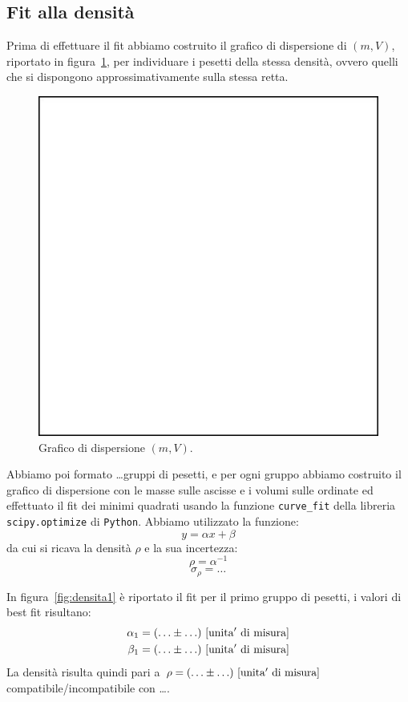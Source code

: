 \documentclass[a4paper]{article}
\begin{document}
\subsection{Fit alla densit\`a}

Prima di effettuare il fit abbiamo costruito il grafico di dispersione di $(m,V)$, riportato in figura~\ref{fig:dispersione},
per individuare i pesetti della stessa densit\`a, ovvero quelli che si dispongono approssimativamente sulla stessa retta.

\begin{figure}
    \centering
     \includegraphics[width=0.5\linewidth]{blankfig.pdf}
    \caption{Grafico di dispersione $(m,V)$.}
    \label{fig:dispersione}
\end{figure}

Abbiamo poi formato \ldots gruppi di pesetti, e per ogni gruppo abbiamo costruito il grafico di
dispersione con le masse sulle ascisse e i volumi sulle ordinate ed effettuato il fit dei minimi
quadrati usando la funzione \verb|curve_fit| della libreria \verb|scipy.optimize| di 
\verb|Python|. Abbiamo utilizzato la funzione:
\begin{equation}
    y = \alpha x + \beta
\end{equation}
da cui si ricava la densit\`a $\rho$ e la sua incertezza:
\begin{equation}
    \rho = \alpha^{-1}
\end{equation}
\begin{equation}
    \sigma_{\rho} = \ldots
\end{equation}

In figura~\ref{fig:densita1} \`e riportato il  fit per il primo gruppo di pesetti, i valori di best fit risultano:
\begin{eqnarray}
    \alpha_1 = (\ldots \pm \ldots)\ \rm [unita'\ di\ misura] \\
    \beta_1 = (\ldots \pm \ldots)\ \rm [unita'\ di\ misura]
\end{eqnarray}
La densit\`a risulta quindi pari a $\rho = (\ldots\pm\ldots)\ \rm [unita'\ di\ misura]$ compatibile/incompatibile con \ldots.
\end{document}
